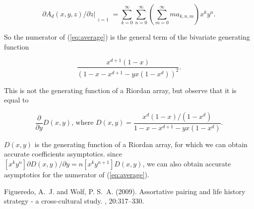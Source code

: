 \documentclass{article}
\begin{document}
\begin{equation*}
\partial A_d(x,y,z)/\partial z\Bigr|_{\substack{\\z=1}} =
\sum_{k=0}^\infty\sum_{n=0}^\infty
\left(\sum_{m=0}^\infty ma_{k,n,m}\right) x^ky^n.
\end{equation*}

So the numerator of (\ref{eq:average}) is the general term of the
bivariate generating function

\begin{equation*}
\frac{x^{d+1}(1-x)}{\left(1-x-x^{d+1}-yx(1-x^d)\right)^2}.
\end{equation*}

This is not the generating function of a Riordan array, but observe that
it is equal to

\begin{equation*}
\frac{\partial}{\partial y} D(x,y)\text{, where }
D(x,y) = \frac{x^d(1-x)/(1-x^d)}{1-x-x^{d+1}-yx(1-x^d)}.
\end{equation*}

$D(x,y)$ is the generating function of a Riordan array, for which we can
obtain accurate coefficients asymptotics. since $[x^ky^n]\partial D(x,y) /
\partial y = n[x^ky^{n+1}]D(x,y)$, we can also obtain accurate asymptotics
for the numerator of (\ref{eq:average}).


\begin{thebibliography}{99}

Figueredo, A.~J. and Wolf, P. S.~A. (2009).
\newblock Assortative pairing and life history strategy - a cross-cultural
  study.
, 20:317--330.
 
\end{thebibliography}

\end{document}
